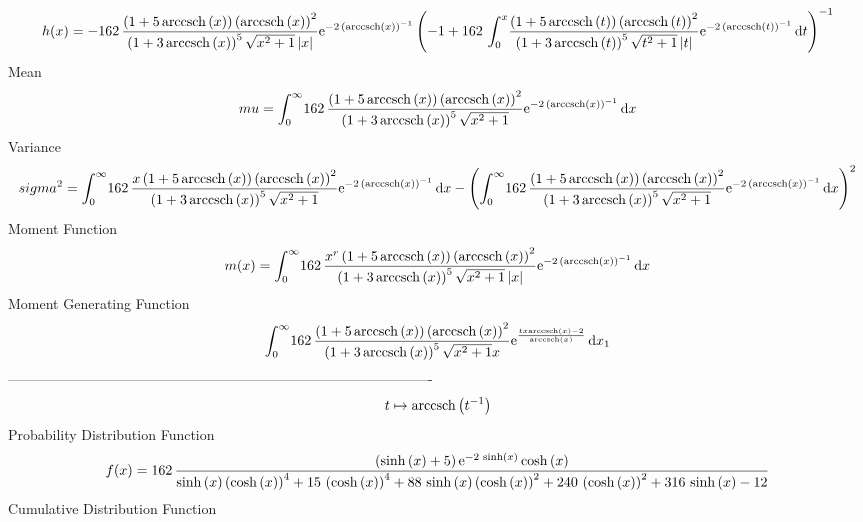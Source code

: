 \documentclass[12pt]{article}
\begin{document}
 $$ h(x)=-162\,{\frac { \left( 1+5\,{\rm arccsch} \left(x\right) \right) 
 \left( {\rm arccsch} \left(x\right) \right) ^{2}}{ \left( 1+3\,
{\rm arccsch} \left(x\right) \right) ^{5}\sqrt {{x}^{2}+1} \left| x
 \right| }{{\rm e}^{-2\, \left( {\rm arccsch} \left(x\right) \right) ^
{-1}}} \left( -1+162\,\int_{0}^{x}\!{\frac { \left( 1+5\,{\rm arccsch}
 \left(t\right) \right)  \left( {\rm arccsch} \left(t\right) \right) ^
{2}}{ \left( 1+3\,{\rm arccsch} \left(t\right) \right) ^{5}\sqrt {{t}^
{2}+1} \left| t \right| }{{\rm e}^{-2\, \left( {\rm arccsch} \left(t
\right) \right) ^{-1}}}}\,{\rm d}t \right) ^{-1}}
$$Mean 
 $$ mu=\int_{0}^{\infty }\!162\,{\frac { \left( 1+5\,{\rm arccsch} \left(x
\right) \right)  \left( {\rm arccsch} \left(x\right) \right) ^{2}}{
 \left( 1+3\,{\rm arccsch} \left(x\right) \right) ^{5}\sqrt {{x}^{2}+1
}}{{\rm e}^{-2\, \left( {\rm arccsch} \left(x\right) \right) ^{-1}}}}
\,{\rm d}x
$$ Variance 
 $$ sigma^2 = \int_{0}^{\infty }\!162\,{\frac {x \left( 1+5\,{\rm arccsch} \left(x
\right) \right)  \left( {\rm arccsch} \left(x\right) \right) ^{2}}{
 \left( 1+3\,{\rm arccsch} \left(x\right) \right) ^{5}\sqrt {{x}^{2}+1
}}{{\rm e}^{-2\, \left( {\rm arccsch} \left(x\right) \right) ^{-1}}}}
\,{\rm d}x- \left( \int_{0}^{\infty }\!162\,{\frac { \left( 1+5\,
{\rm arccsch} \left(x\right) \right)  \left( {\rm arccsch} \left(x
\right) \right) ^{2}}{ \left( 1+3\,{\rm arccsch} \left(x\right)
 \right) ^{5}\sqrt {{x}^{2}+1}}{{\rm e}^{-2\, \left( {\rm arccsch} 
\left(x\right) \right) ^{-1}}}}\,{\rm d}x \right) ^{2}
$$Moment Function 
 $$ m(x) = \int_{0}^{\infty }\!162\,{\frac {{x}^{r} \left( 1+5\,{\rm arccsch} 
\left(x\right) \right)  \left( {\rm arccsch} \left(x\right) \right) ^{
2}}{ \left( 1+3\,{\rm arccsch} \left(x\right) \right) ^{5}\sqrt {{x}^{
2}+1} \left| x \right| }{{\rm e}^{-2\, \left( {\rm arccsch} \left(x
\right) \right) ^{-1}}}}\,{\rm d}x
$$ Moment Generating Function 
 $$\int_{0}^{\infty }\!162\,{\frac { \left( 1+5\,{\rm arccsch} \left(x
\right) \right)  \left( {\rm arccsch} \left(x\right) \right) ^{2}}{
 \left( 1+3\,{\rm arccsch} \left(x\right) \right) ^{5}\sqrt {{x}^{2}+1
}x}{{\rm e}^{{\frac {tx{\rm arccsch} \left(x\right)-2}{{\rm arccsch} 
\left(x\right)}}}}}\,{\rm d}x_{{1}}
$$-------------------------------------------------------------------------------------------  \\$$t\mapsto {\rm arccsch} \left({t}^{-1}\right)
$$Probability Distribution Function 
$$  f(x)=162\,{\frac { \left( \sinh \left( x \right) +5 \right) {{\rm e}^{-2\,
\sinh \left( x \right) }}\cosh \left( x \right) }{\sinh \left( x
 \right)  \left( \cosh \left( x \right)  \right) ^{4}+15\, \left( 
\cosh \left( x \right)  \right) ^{4}+88\,\sinh \left( x \right) 
 \left( \cosh \left( x \right)  \right) ^{2}+240\, \left( \cosh
 \left( x \right)  \right) ^{2}+316\,\sinh \left( x \right) -12}}
$$Cumulative Distribution Function  
\end{document}
